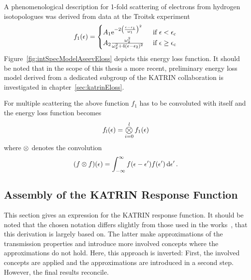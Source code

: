 A phenomenological description for 1-fold scattering of electrons from hydrogen isotopologues was derived from data at the Troitsk experiment~\cite{Aseev2000, Abdurashitov2017}
\begin{equation}
\label{eq:intSpecModelAseevEloss}
	f_1(\epsilon) =
	\begin{cases}
		A_1 
		\mathrm{e}^{ 
			-2\left(
			\frac{\epsilon-\epsilon_1}{\omega_1}
			\right)^2
		}
		&\text{ if } \epsilon < \epsilon_\mathrm{c} \\
		A_2\frac{
			\omega_2^2
		}{
			\omega_2^2+4(\epsilon-\epsilon_2)^2
		} 
		&\text{ if } \epsilon \geq \epsilon_\mathrm{c}
	\end{cases}
\end{equation}
Figure~\ref{fig:intSpecModelAseevEloss} depicts this energy loss function. It should be noted that in the scope of this thesis a more recent, preliminary energy loss model derived from a dedicated subgroup of the KATRIN collaboration is investigated in chapter~\ref{sec:katrinEloss}.

For multiple scattering the above function $f_1$ has to be convoluted with itself and the energy loss function becomes~\cite{Kleesiek2019}
\begin{equation}
	\label{eq:intSpecModelConvolutedEloss}
	f_l(\epsilon) = \Conv_{i=0}^{l} f_1(\epsilon)
\end{equation}
where $\otimes$ denotes the convolution
\begin{equation}
(f \otimes f)(\epsilon) = 
\int_{-\infty}^{\infty}  
	f(\epsilon-\epsilon^\prime)f(\epsilon^\prime)
\mathop{}\!\mathrm{d} \epsilon^\prime 
\text{\,.} 
\end{equation}

\subsection{Assembly of the KATRIN Response Function}
\label{sec:intSpecModelResponseReconciliation}
This section gives an expression for the KATRIN response function. It should be noted that the chosen notation differs slightly from those used in the works~\cite{Groh2015,Kleesiek2019}, that this derivation is largely based on. The latter make approximations of the transmission properties and introduce more involved concepts where the approximations do not hold. Here, this approach is inverted: First, the involved concepts are applied and the approximations are introduced in a second step. However, the final results reconcile.

